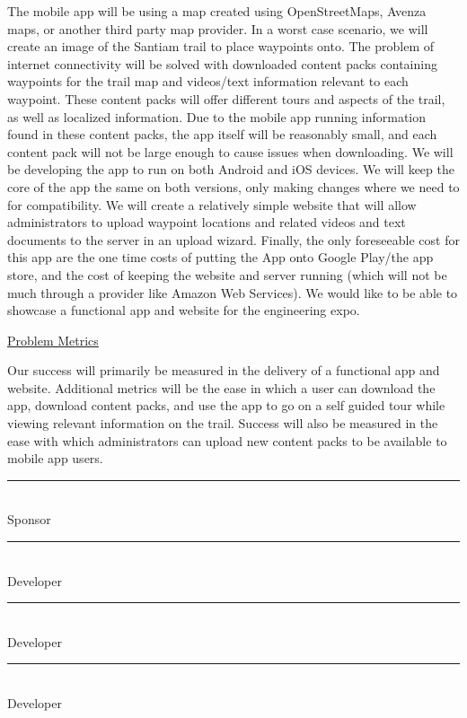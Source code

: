 \documentclass[letterpaper,10pt,titlepage]{article}
\begin{document}
The mobile app will be using a map created using OpenStreetMaps, Avenza maps, or another third party map provider. In a worst case scenario, we will create an image of the Santiam trail to place waypoints onto. The problem of internet connectivity will be solved with downloaded content packs containing waypoints for the trail map and videos/text information relevant to each waypoint. These content packs will offer different tours and aspects of the trail, as well as localized information. Due to the mobile app running information found in these content packs, the app itself will be reasonably small, and each content pack will not be large enough to cause issues when downloading. We will be developing the app to run on both Android and iOS devices. We will keep the core of the app the same on both versions, only making changes where we need to for compatibility. We will create a relatively simple website that will allow administrators to upload waypoint locations and related videos and text documents to the server in an upload wizard. Finally, the only foreseeable cost for this app are the one time costs of putting the App onto Google Play/the app store, and the cost of keeping the website and server running (which will not be much through a provider like Amazon Web Services). We would like to be able to showcase a functional app and website for the engineering expo. \\
\vspace{0.8cm}


\begin{center}
\underline{Problem Metrics}\\
\vspace{0.3cm}
\end{center}

Our success will primarily be measured in the delivery of a functional app and website. Additional metrics will be the ease in which a user can download the app, download content packs, and use the app to go on a self guided tour while viewing relevant information on the trail. Success will also be measured in the ease with which administrators can upload new content packs to be available to mobile app users.\\
\vspace{1.5cm}

\newpage
\textbf{ }
\vspace{5.0cm}

\noindent\rule{13cm}{0.4pt}\\
Sponsor
\vspace{3.0cm}

\noindent\rule{13cm}{0.4pt}\\
Developer
\vspace{3.0cm}


\noindent\rule{13cm}{0.4pt}\\
Developer
\vspace{3.0cm}


\noindent\rule{13cm}{0.4pt}\\
Developer
\vspace{3.0cm}
\end{document}
